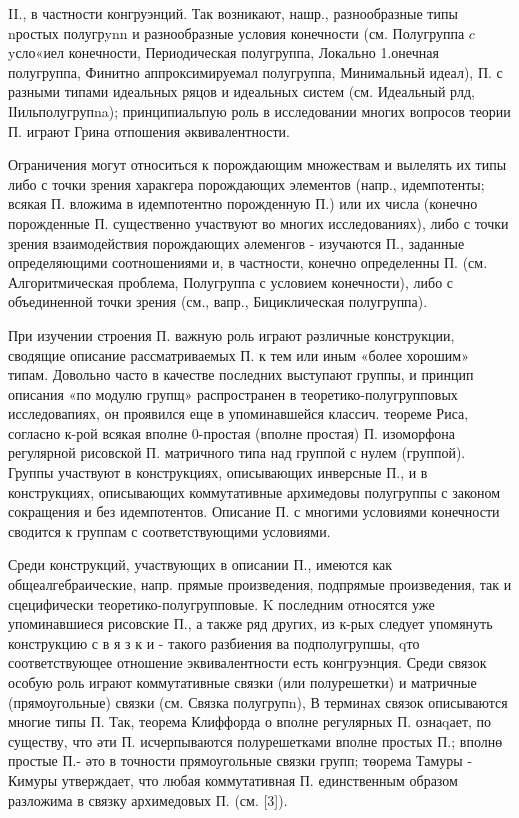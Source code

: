 \documentclass[10pt]{article}
\begin{document}
II., в частности конгруэнций. Так возникают, нашр., разнообразные типы nростых полугрynn и разнообразные условия конечности (см. Полугруппа $c$ yсло«иел конечности, Периодическая полугруппа, Локально 1.онечная полугруппа, Финитно аппроксимируемал полугруппа, Минимальньй идеал), П. с разными типами идеальных ряцов и идеальных систем (см. Идеальный рлд, IІильполугрупna); принципиальпую роль в исследовании многих вопросов теории П. играют Грина отпошения әквивалентности.



Ограничения могут относиться к порождающим множествам и вылелять их типы либо с точки зрения харакгера порождающих элементов (напр., идемпотенты; всякая П. вложима в идемпотентно порожденную П.) или их числа (конечно порожденные П. существенно участвуют во многих исследованиях), либо с точки зрения взаимодействия порождающих әлеменгов - изучаются П., заданные определяющими соотношениями и, в частности, конечно определенны $П$. (см. Алгоритмическая проблема, Полугруппа с условием конечности), либо с объединенной точки зрения (см., вапр., Бициклическая полугруппа).



При изучении строения П. важную роль играют рәзличные конструкции, сводящие описание рассматриваемых П. к тем или иным «более хорошим» типам. Довольно часто в качестве последних выступают группы, и принцип описания «по модулю групщ» распространен в теоретико-полугрупповых исследовапиях, он проявился еще в упоминавшейся классич. теореме Риса, согласно к-рой всякая вполне 0-простая (вполне простая) П. изоморфона регулярной рисовской П. матричного типа над группой с нулем (группой). Группы участвуют в конструкциях, описывающих инверсные П., и в конструкциях, описывающих коммутативные архимедовы полугруппы с законом сокращения и без идемпотентов. Описание П. с многими условиями конечности сводится к группам с соответствующими условиями.



Среди конструкций, участвующих в описании П., имеются как общеалгебраические, напр. прямые произведения, подпрямые произведения, так и сцецифически теоретико-полугрупповые. $\mathrm{K}$ последним относятся уже упоминавшиеся рисовские П., а также ряд других, из к-рых следует упомянуть конструкцию с в я з к и - такого разбиения ва подполугрупшы, qто соответствующее отношение эквивалентности есть конгруэнция. Среди связок особую роль играют коммутативные связки (или полурешетки) и матричные (прямоугольные) связки (см. Связка полугрупn), В терминах связок описываются многие типы П. Так, теорема Клиффорда о вполне регулярных П. ознаqает, по существу, что әти П. исчерпываются полурешетками вполне простых П.; вполнө простые П.- әто в точности прямоугольные связки групп; төорема Тамуры - Кимуры утверждает, что любая коммутативная П. единственным образом разложима в связку архимедовых П. (см. [3]).
\end{document}
